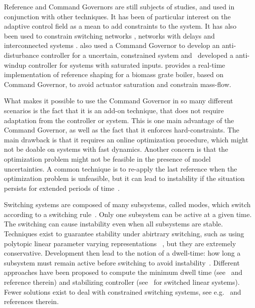 Reference and Command Governors are still subjects of studies, and used in
conjunction with other techniques. It has been of particular interest on the
adaptive control field
\parencite{arabi.yucelen.ea:command,ristevski.dogan.ea:transient,wilcher.jaramillo.ea:on,dogan.yucelen.ea:improving,gruenwald.yucelen.ea:expanded,makavita.jayasinghe.ea:experimental}
as a mean to add constraints to the system. It has also been used to constrain
switching networks \parencite{ong.djamari.ea:governor}, networks with delays
\parencite{shen.song.ea:constrained} and interconnected systems
\parencite{tedesco.casavola:turn-based}. \textcite{peng.wang.ea:constrained}
also used a Command Governor to develop an anti-disturbance controller for a
uncertain, constrained system
and~\textcite{schwerdtner.bortoff.ea:projection-based} developed a anti-windup
controller for systems with saturated inputs.
\textcite{seeber.golles.ea:reference} provides a real-time implementation of
reference shaping for a biomass grate boiler, based on Command Governor, to
avoid actuator saturation and constrain mass-flow.

What makes it possible to use the Command Governor in so many different scenarios is the fact that it is an add-on technique, that does not require adaptation from the controller or system. This is one main advantage of the Command Governor, as well as the fact that it enforces hard-constraints. The main drawback is that it requires an online optimization procedure, which might not be doable on systems with fast dynamics. Another concern is that the optimization problem might not be feasible in the presence of model uncertainties. A common technique is to re-apply the last reference when the optimization problem is unfeasible, but it can lead to instability if the situation persists for extended periods of time~\parencite{garone.di-cairano.ea:reference}.

Switching systems are composed of many subsystems, called modes, which switch
according to a switching
rule~\parencite{liberzon:switching,liberzon.morse:basic}. Only one subsystem can
be active at a given time. The switching can cause instability even when all
subsystems are stable. Techniques exist to guarantee stability under abirtrary
switching, such as using polytopic linear parameter varying
representations~\parencite{deaecto.geromel.ea:robust} , but they are extremely
conservative. Development then lead to the notion of a dwell-time: how long a
subsystem must remain active before switching to avoid
instability~\parencite{liberzon.morse:basic}. Different approaches have been
proposed to compute the minimum dwell time
(see~\parencite{chesi.colaneri.ea:computing} and reference therein) and
stabilizing controller (see~\parencite{lin.antsaklis:stability} for switched
linear systems). Fewer solutions exist to deal with constrained switching
systems, see e.g.~\parencite{franzè.lucia.ea:command,lucia.franzè:stabilization}
and references therein.

